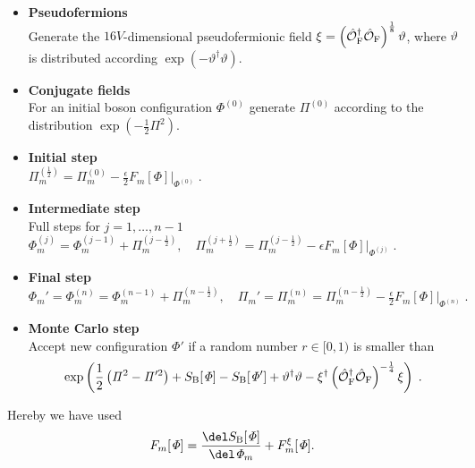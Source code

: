 %
%
\begin{itemize}
\item \textbf{Pseudofermions}\\
Generate the $16V$-dimensional pseudofermionic field $\xi = \left(\hat{\mathcal{O}}_{\rm F}^{\dagger}\hat{\mathcal{O}}_{\rm F}\right)^{\frac{1}{8}} \vartheta$, where $\vartheta$ is distributed according $\exp\left(-\vartheta^{\dagger}\vartheta\right)$.
%
%
\item \textbf{Conjugate fields}\\
For an initial boson configuration $\mathit{\Phi}^{(0)}$ generate $\mathit{\Pi}^{(0)}$ according to the  distribution $\exp \left(-\frac{1}{2}\mathit{\Pi}^{2}\right)$.
%
%
\item \textbf{Initial step}\\
$\mathit{\Pi}_{m}^{(\frac{1}{2})} = \mathit{\Pi}_{m}^{(0)} - \frac{\epsilon}{2} F_{m}[\mathit{\Phi}]\Big\vert_{\mathit{\Phi}^{(0)}}  \;.$
%
%
\item \textbf{Intermediate step}\\
Full steps for $j=1,\ldots,n-1$ \\[0.2cm]
$\mathit{\Phi}_{m}^{(j)} = \mathit{\Phi}_{m}^{(j-1)} + \mathit{\Pi}_{m}^{(j-\frac{1}{2})}, \quad  \mathit{\Pi}_{m}^{(j+\frac{1}{2})} = \mathit{\Pi}_{m}^{(j-\frac{1}{2})} - \epsilon F_{m}[\mathit{\Phi}]\Big\vert_{\mathit{\Phi}^{(j)}}\;.$
%
%
\item \textbf{Final step}\\
$\mathit{\Phi}_{m}' = \mathit{\Phi}_{m}^{(n)} = \mathit{\Phi}_{m}^{(n-1)} + \mathit{\Pi}_{m}^{(n-\frac{1}{2})}, \quad \mathit{\Pi}_{m}' = \mathit{\Pi}_{m}^{(n)} = \mathit{\Pi}_{m}^{(n-\frac{1}{2})} - \frac{\epsilon}{2} F_{m}[\mathit{\Phi}]\Big\vert_{\mathit{\Phi}^{(n)}}\;.$
%
%
\item \textbf{Monte Carlo step}\\
Accept new configuration $\mathit{\Phi}'$ if a random number $r \in [0,1)$ is smaller than
\[\exp\left(\frac{1}{2}\left(\mathit{\Pi}^{2}-\mathit{\Pi}'^{2}\right) + S_{\rm B}[\mathit{\Phi}]- S_{\rm B}[\mathit{\Phi}'] +\vartheta^{\dagger}\vartheta - \xi^{\dagger} \left(\hat{\mathcal{O}}_{\rm F}^{\dagger}\hat{\mathcal{O}}_{\rm F}\right)^{-\frac{1}{4}} \xi \right) \;.  \]
\end{itemize}
%
%
Hereby we have used 
%
%
\begin{equation}
F_{m}[\mathit{\Phi}] = \frac{\del S_{\rm B}[\mathit{\Phi}]}{\del \mathit{\Phi}_{m}} + F_{m}^{\xi}[\mathit{\Phi}].
\end{equation}
